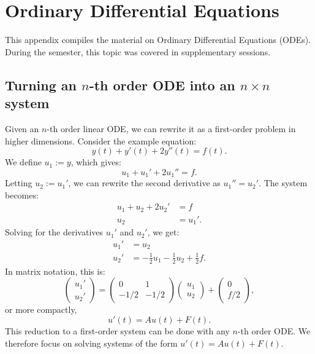 \chapter{Ordinary Differential Equations}
\label{ch:odes}

\begin{ainote}
This appendix compiles the material on Ordinary Differential Equations (ODEs). During the semester, this topic was covered in supplementary sessions.
\end{ainote}

\section{Turning an \texorpdfstring{$n$}{n}-th order ODE into an \texorpdfstring{$n \times n$}{n x n} system}
\label{sec:nth_order_to_system}

Given an $n$-th order linear ODE, we can rewrite it as a first-order problem in higher dimensions.
Consider the example equation:
\[y(t) + y'(t) + 2y''(t) = f(t).\]
We define $u_1 := y$, which gives:
\[u_1 + u_1' + 2u_1'' = f.\]
Letting $u_2 := u_1'$, we can rewrite the second derivative as $u_1'' = u_2'$. The system becomes:
\begin{align*}
    u_1 + u_2 + 2u_2' &= f \\
    u_2 &= u_1'.
\end{align*}
Solving for the derivatives $u_1'$ and $u_2'$, we get:
\begin{align*}
    u_1' &= u_2 \\
    u_2' &= -\frac{1}{2}u_1 - \frac{1}{2}u_2 + \frac{1}{2}f.
\end{align*}
In matrix notation, this is:
\[\begin{pmatrix} u_1' \\ u_2' \end{pmatrix} = \begin{pmatrix} 0 & 1 \\ -1/2 & -1/2 \end{pmatrix} \begin{pmatrix} u_1 \\ u_2 \end{pmatrix} + \begin{pmatrix} 0 \\ f/2 \end{pmatrix},\]
or more compactly,
\[u'(t) = A u(t) + F(t).\]
This reduction to a first-order system can be done with any $n$-th order ODE. We therefore focus on solving systems of the form $u'(t) = A u(t) + F(t)$.

